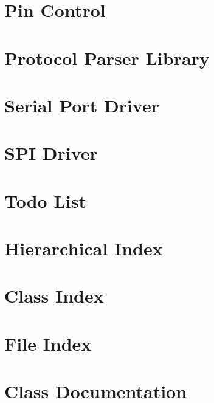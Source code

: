 \documentclass[twoside]{book}
\newcommand{\+}{\discretionary{\mbox{\scriptsize$\hookleftarrow$}}{}{}}
\begin{document}
\chapter{Pin Control}
\label{md_lib_pin_control__r_e_a_d_m_e}

\chapter{Protocol Parser Library}
\label{md_lib_protocol_parser__r_e_a_d_m_e}

\chapter{Serial Port Driver}
\label{md_lib_serial_port_driver__r_e_a_d_m_e}

\chapter{SPI Driver}
\label{md_lib_spi_driver__r_e_a_d_m_e}

\chapter{Todo List}
\label{todo}

\chapter{Hierarchical Index}

\chapter{Class Index}

\chapter{File Index}

\chapter{Class Documentation}




























\end{document}
